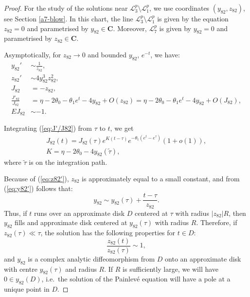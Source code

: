  \begin{proof}
For the study of the solutions near $\mathcal{L}_3^p\setminus\mathcal{L}_1^p$, we use coordinates $(y_{82},z_{82})$, see Section \ref{a7-blow}.
In this chart, the line $\mathcal{L}_3^p\setminus\mathcal{L}_1^p$ is given by the equation $z_{82}=0$ and parametrised by $y_{82}\in\mathbf{C}$.
Moreover, $\mathcal{L}_7^p$ is given by $y_{82}=0$ and parametrised by $z_{82}\in\mathbf{C}$.
 
Asymptotically, for $z_{82}\to0$ and bounded $y_{82}$, $e^{-t}$, we have:
\begin{subequations}
\begin{align}
y_{82}' &\sim\frac1{z_{82}},\label{eq:y82'}
\\
z_{82}' &\sim4y_{82}^3z_{82}^2,\label{eq:z82'}
\\
J_{82} &=-z_{82},\label{eq:J82}
\\
\frac{J'_{82}}{J_{82}} & = \eta-2\theta_0-\theta_1e^t-4y_{82}+O(z_{82})=\eta-2\theta_0-\theta_1e^t-4y_{82}+O(J_{82}),\label{eq:J'/J82}
\\
EJ_{82} & \sim -1.\label{eq:EJ82}
\end{align}
\end{subequations}

Integrating (\ref{eq:J'/J82}) from $\tau$ to $t$, we get
\begin{gather*}
J_{82}(t)=J_{82}(\tau)e^{K(t-\tau)}e^{-\theta_1(e^t-e^{\tau})}(1+o(1)),
\\
K=\eta-2\theta_0-4y_{82}(\tilde{\tau}),
\end{gather*}
where $\tilde{\tau}$ is on the integration path.

Because of (\ref{eq:z82'}), $z_{82}$ is approximately equal to a small constant, and from (\ref{eq:y82'}) follows that:
$$
y_{82}\sim y_{82}(\tau)+\frac{t-\tau}{z_{82}}.
$$
Thus, if $t$ runs over an approximate disk $D$ centered at $\tau$ with radius $|z_{82}|R$, then $y_{82}$ fills and approximate disk centered at $y_{82}(\tau)$ with radius $R$.
Therefore, if $z_{82}(\tau)\ll\tau$, the solution has the following properties for $t\in D$:
$$
\frac{z_{82}(t)}{z_{82}(\tau)}\sim1,
 $$ 
 and $y_{82}$ is a complex analytic diffeomorphism from $D$ onto an approximate disk with centre $y_{82}(\tau)$ and radius $R$.
 If $R$ is sufficiently large, we will have $0\in y_{82}(D)$, i.e.~the solution of the Painlev\'e equation will have a pole at a unique point in $D$.
 

\end{proof}
